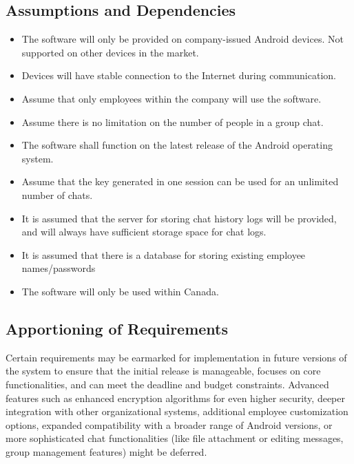 \documentclass[]{article}
\begin{document}
\subsection{Assumptions and Dependencies}
\label{sub:assumptions_and_dependencies}
\begin{itemize}
	\item The software will only be provided on company-issued Android devices. Not supported on other devices in the market.
    \item Devices will have stable connection to the Internet during communication. 
    \item Assume that only employees within the company will use the software. 
    \item Assume there is no limitation on the number of people in a group chat.  
    \item The software shall function on the latest release of the Android operating system. 
    \item Assume that the key generated in one session can be used for an unlimited number of chats. 
    \item It is assumed that the server for storing chat history logs will be provided, and will always have sufficient storage space for chat logs. 
    \item It is assumed that there is a database for storing existing employee names/passwords
    \item The software will only be used within Canada.

\end{itemize}

\subsection{Apportioning of Requirements}
\label{sub:apportioning_of_requirements}
\hspace{5mm}Certain requirements may be earmarked for implementation in future versions of the system to ensure that the initial release is manageable, focuses on core functionalities, and can meet the deadline and budget constraints. Advanced features such as enhanced encryption algorithms for even higher security, deeper integration with other organizational systems, additional employee customization options, expanded compatibility with a broader range of Android versions, or more sophisticated chat functionalities (like file attachment or editing messages, group management features) might be deferred. 
\end{document}
